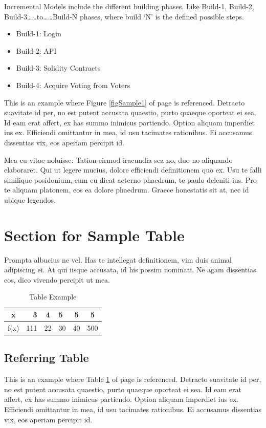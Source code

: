 Incremental Models include the different building phases. Like Build-1, Build-2, Build-3……to……Build-N phases, where build ‘N’ is the defined possible steps.

\begin{itemize}
\item Build-1: Login
\item Build-2: API
\item Build-3: Solidity Contracts
\item Build-4: Acquire Voting from Voters
\end{itemize}

This is an example where Figure \ref{figSample1} of page \pageref{figSample1} is referenced. Detracto suavitate id per, no est putent accusata quaestio, purto quaeque oporteat ei sea. Id eam erat affert, ex has summo inimicus partiendo. Option aliquam imperdiet ius ex. Efficiendi omittantur in mea, id usu tacimates rationibus. Ei accusamus dissentias vix, eos aperiam percipit id.

Mea cu vitae noluisse. Tation eirmod iracundia sea no, duo no aliquando elaboraret. Qui ut legere mucius, dolore efficiendi definitionem quo ex. Usu te falli similique posidonium, eum eu dicat aeterno phaedrum, te paulo deleniti ius. Pro te aliquam platonem, eos ea dolore phaedrum. Graece honestatis sit at, nec id ubique legendos.

\section{Section for Sample Table}
Prompta albucius ne vel. Has te intellegat definitionem, vim duis animal adipiscing ei. At qui iisque accusata, id his possim nominati. Ne agam dissentias eos, dico vivendo percipit ut mea.

\begin{table}[tbh]
\centering
\caption{Table Example}
\begin{tabular}{|c|r|c|l|c|c|} %
	\hline %
	x &3 &4 &5 &5 &5\\
	\hline %
	f(x) &111 &22 &30 &40 &500\\
	\hline %
\end{tabular}
\label{tblSampleTable}
\end{table}

\subsection{Referring Table}
This is an example where Table \ref{tblSampleTable} of page \pageref{tblSampleTable} is referenced. Detracto suavitate id per, no est putent accusata quaestio, purto quaeque oporteat ei sea. Id eam erat affert, ex has summo inimicus partiendo. Option aliquam imperdiet ius ex. Efficiendi omittantur in mea, id usu tacimates rationibus. Ei accusamus dissentias vix, eos aperiam percipit id.

